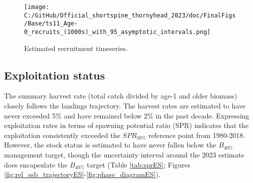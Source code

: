 \documentclass[11pt,
  english,
  letterpaper,
]{article}
\begin{document}
\begin{figure}
\centering
\texttt{[image: C:/GitHub/Official\_shortspine\_thornyhead\_2023/doc/FinalFigs/Base/ts11\_Age-0\_recruits\_(1000s)\_with\_95\_asymptotic\_intervals.png]}
\caption{Estimated recruitment timeseries.\label{fig:rec_trajectoryES}}
\end{figure}

\hypertarget{exploitation-status}{%
\subsection*{Exploitation status}\label{exploitation-status}}

The summary harvest rate (total catch divided by age-1 and older biomass) closely follows the landings trajectory. The harvest rates are estimated to have never exceeded 5\% and have remained below 2\% in the past decade. Expressing exploitation rates in terms of spawning potential ratio (SPR) indicates that the exploitation consistently exceeded the \(SPR_{50\%}\) reference point from 1980-2018. However, the stock status is estimated to have never fallen below the \(B_{40\%}\) management target, though the uncertainty interval around the 2023 estimate does encapsulate the \(B_{40\%}\) target (Table \ref{tab:sprES}; Figures \ref{fig:rel_ssb_trajectoryES}-\ref{fig:phase_diagramES}).

\begingroup\fontsize{10}{12}\selectfont
\begingroup\fontsize{10}{12}\selectfont
\end{document}
